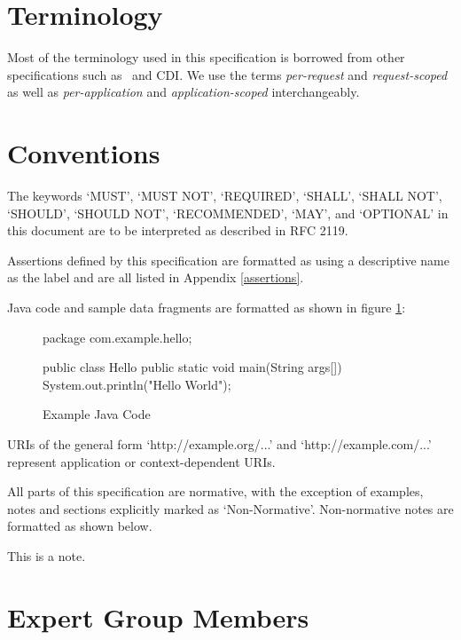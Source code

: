 \section{Terminology}
\label{terminology}

Most of the terminology used in this specification is borrowed from other specifications 
such as \jaxrs\ and CDI. We use the terms {\em per-request} and {\em request-scoped} as
well as {\em per-application} and {\em application-scoped} interchangeably.

\section{Conventions}

The keywords `MUST', `MUST NOT', `REQUIRED', `SHALL', `SHALL NOT', `SHOULD', `SHOULD NOT', 
`RECOMMENDED', `MAY', and `OPTIONAL' in this document are to be interpreted as described in 
RFC 2119\cite{rfc2119}. 

Assertions defined by this specification are formatted as {\textbf{\rrb}} 
using a descriptive name as the label and are all listed in Appendix \ref{assertions}.

Java code and sample data fragments are formatted as shown in figure \ref{ex1}:

\begin{figure}[hbtp]
\caption{Example Java Code}
\label{ex1}
\begin{listing}{1}
package com.example.hello;

public class Hello {
    public static void main(String args[]) {
        System.out.println("Hello World");
    }
}\end{listing}
\end{figure}

URIs of the general form `http://example.org/...' and `http://example.com/...' represent application 
or context-dependent URIs.

All parts of this specification are normative, with the exception of examples, notes and sections
explicitly marked as `Non-Normative'. Non-normative notes are formatted as shown below.

\begin{nnnote*}
This is a note.
\end{nnnote*}

\section{Expert Group Members} 
\label{expert_group}

